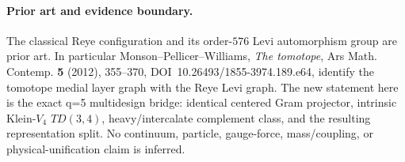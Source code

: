 \paragraph{Prior art and evidence boundary.}
The classical Reye configuration and its order-$576$ Levi automorphism group
are prior art.  In particular Monson--Pellicer--Williams, \emph{The tomotope},
Ars Math. Contemp. \textbf{5} (2012), 355--370,
DOI~10.26493/1855-3974.189.e64, identify the tomotope medial layer graph with
the Reye Levi graph.  The new statement here is the exact q=5 multidesign
bridge: identical centered Gram projector, intrinsic Klein-$V_4$ $TD(3,4)$,
heavy/intercalate complement class, and the resulting representation split.
No continuum, particle, gauge-force, mass/coupling, or physical-unification
claim is inferred.
